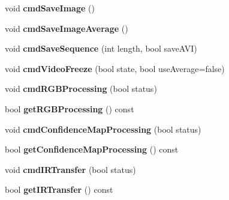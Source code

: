 \begin{DoxyCompactItemize}
\item 
\hypertarget{classTDVCameraInterfaceBase2_ab1bfb1c5500793508cbe2c1c7d8d9a2b}{
void {\bfseries cmdSaveImage} ()}
\label{classTDVCameraInterfaceBase2_ab1bfb1c5500793508cbe2c1c7d8d9a2b}

\item 
\hypertarget{classTDVCameraInterfaceBase2_a528e6c9ab7b284456571e5c954e0663a}{
void {\bfseries cmdSaveImageAverage} ()}
\label{classTDVCameraInterfaceBase2_a528e6c9ab7b284456571e5c954e0663a}

\item 
\hypertarget{classTDVCameraInterfaceBase2_a7efb94988412cbb758d3b8971f4463a9}{
void {\bfseries cmdSaveSequence} (int length, bool saveAVI)}
\label{classTDVCameraInterfaceBase2_a7efb94988412cbb758d3b8971f4463a9}

\item 
\hypertarget{classTDVCameraInterfaceBase2_aa2705a831908bb92aea85cb3cde82854}{
void {\bfseries cmdVideoFreeze} (bool state, bool useAverage=false)}
\label{classTDVCameraInterfaceBase2_aa2705a831908bb92aea85cb3cde82854}

\item 
\hypertarget{classTDVCameraInterfaceBase2_a649b5e579d9f165c3fd08ca224bac40a}{
void {\bfseries cmdRGBProcessing} (bool status)}
\label{classTDVCameraInterfaceBase2_a649b5e579d9f165c3fd08ca224bac40a}

\item 
\hypertarget{classTDVCameraInterfaceBase2_a662d62abb6a0b268e9fe95fd545c360c}{
bool {\bfseries getRGBProcessing} () const }
\label{classTDVCameraInterfaceBase2_a662d62abb6a0b268e9fe95fd545c360c}

\item 
\hypertarget{classTDVCameraInterfaceBase2_a6f2b9e9efbbaddfc80801ab5cd0a99f1}{
void {\bfseries cmdConfidenceMapProcessing} (bool status)}
\label{classTDVCameraInterfaceBase2_a6f2b9e9efbbaddfc80801ab5cd0a99f1}

\item 
\hypertarget{classTDVCameraInterfaceBase2_a326817d66da92c7f7b022d8460097019}{
bool {\bfseries getConfidenceMapProcessing} () const }
\label{classTDVCameraInterfaceBase2_a326817d66da92c7f7b022d8460097019}

\item 
\hypertarget{classTDVCameraInterfaceBase2_ab1bea9c049e62e010f0f62a168bc30d2}{
void {\bfseries cmdIRTransfer} (bool status)}
\label{classTDVCameraInterfaceBase2_ab1bea9c049e62e010f0f62a168bc30d2}

\item 
\hypertarget{classTDVCameraInterfaceBase2_ab3f3b322e7216a5222306e1fc2debcbe}{
bool {\bfseries getIRTransfer} () const }
\label{classTDVCameraInterfaceBase2_ab3f3b322e7216a5222306e1fc2debcbe}


\end{DoxyCompactItemize}
